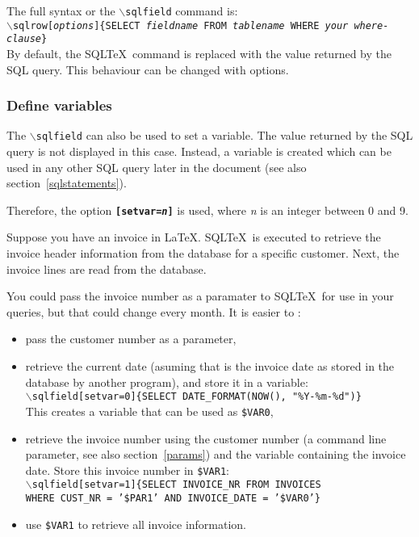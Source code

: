 \documentclass{article}
\newcommand{\bs}{\ensuremath{\backslash}}
\newcommand{\vs}{\vspace{3mm}}
\begin{document}
The full syntax or the \texttt{\bs sqlfield} command is:\\
\texttt{\bs sqlrow[\textit{options}]\{SELECT \textit{fieldname} FROM \textit{tablename} WHERE \textit{your where-clause}\}} \\
By default, the SQL\TeX\ command is replaced with the value returned by the SQL query. This behaviour
can be changed with options.


\subsubsection{Define variables}\label{vars}

The \texttt{\bs sqlfield} can also be used to set a variable. The value returned by the SQL query is not
displayed in this case. Instead, a variable is created which can be used in any other SQL query later in
the document (see also section~\ref{sqlstatements}).

Therefore, the option \texttt{\textbf{[setvar=\textit{n}]}} is used, where \textit{n} is an integer between
0 and 9.

\vs

Suppose you have an invoice in \LaTeX. SQL\TeX\ is executed to retrieve the invoice header information
from the database for a specific customer. Next, the invoice lines are read from the database.

You could pass the invoice number as a paramater to SQL\TeX\ for use in your queries, but that could
change every month. It is easier to :\\
\begin{itemize}
\item pass the customer number as a parameter,
\item retrieve the current date (asuming that is the invoice date as stored in
the database by another program), and store it in a variable: \\
\texttt{\bs sqlfield[setvar=0]\{SELECT DATE\_FORMAT(NOW(), "\%Y-\%m-\%d")\}} \\
This creates a variable that can be used as \texttt{\$VAR0},
\item retrieve the invoice number using the customer number (a command line parameter,
see also section~\ref{params}) and the variable containing the invoice date.
Store this invoice number in \texttt{\$VAR1}: \\
\texttt{\bs sqlfield[setvar=1]\{SELECT INVOICE\_NR FROM INVOICES \\
WHERE CUST\_NR = '\$PAR1' AND INVOICE\_DATE = '\$VAR0'\}}
\item use \texttt{\$VAR1} to retrieve all invoice information.
\end{itemize}
\end{document}
